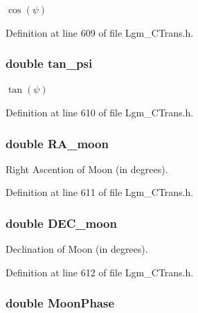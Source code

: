 $\cos(\psi)$ 



Definition at line 609 of file Lgm\_\-CTrans.h.\hypertarget{struct_lgm___c_trans_94023304f56c47803d512bd9f0bd1f22}{
\subsubsection[{tan\_\-psi}]{\setlength{\rightskip}{0pt plus 5cm}double {\bf tan\_\-psi}}}
\label{struct_lgm___c_trans_94023304f56c47803d512bd9f0bd1f22}


$\tan(\psi)$ 



Definition at line 610 of file Lgm\_\-CTrans.h.\hypertarget{struct_lgm___c_trans_15c641f1f3d1a34127f85cef01bb9a75}{
\subsubsection[{RA\_\-moon}]{\setlength{\rightskip}{0pt plus 5cm}double {\bf RA\_\-moon}}}
\label{struct_lgm___c_trans_15c641f1f3d1a34127f85cef01bb9a75}


Right Ascention of Moon (in degrees). 



Definition at line 611 of file Lgm\_\-CTrans.h.\hypertarget{struct_lgm___c_trans_cda12dde2cd80008120d44f6738b3d64}{
\subsubsection[{DEC\_\-moon}]{\setlength{\rightskip}{0pt plus 5cm}double {\bf DEC\_\-moon}}}
\label{struct_lgm___c_trans_cda12dde2cd80008120d44f6738b3d64}


Declination of Moon (in degrees). 



Definition at line 612 of file Lgm\_\-CTrans.h.\hypertarget{struct_lgm___c_trans_830a6cb034c6c685051715f4170252db}{
\subsubsection[{MoonPhase}]{\setlength{\rightskip}{0pt plus 5cm}double {\bf MoonPhase}}}
\label{struct_lgm___c_trans_830a6cb034c6c685051715f4170252db}


